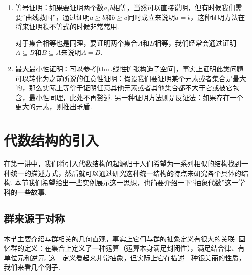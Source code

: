 \begin{enumerate}
    \item 等号证明：如果要证明两个数$a,b$相等，当然可以直接说明，但有时候我们需要``曲线救国''，通过证明$a\geqslant b$和$b\geqslant a$同时成立来说明$a=b$，这种证明方法在将来证明秩不等式的时候非常常用.

          对于集合相等也是同理，要证明两个集合$A$和$B$相等，我们经常会通过证明$A\subseteq B$和$B\subseteq A$来说明$A=B$.

    \item 最大最小性证明：可以参考\autoref{thm:线性扩张构造子空间}，事实上证明此类问题可以转化为之前所说的任意性证明：假设我们要证明某个元素或者集合是最大的，那么实际上等价于证明任意其他元素或者其他集合都不大于它或被它包含，最小性同理，此处不再赘述. 另一种证明方法则是反证法：如果存在一个更大的元素，则推出矛盾.
\end{enumerate}

\section{代数结构的引入}

在第一讲中，我们将引入代数结构的起源归于人们希望为一系列相似的结构找到一种统一的描述方式，然后就可以通过研究这种统一结构的特点来研究各个具体的结构. 本节我们希望给出一些实例展示这一思想，也简要介绍一下``抽象代数''这一学科的一些故事.

\subsection{群来源于对称}

本节主要介绍与群相关的几何直观，事实上它们与群的抽象定义有很大的关联. 回忆群的定义：在集合上定义了一种运算（运算本身满足封闭性），满足结合律、有单位元和逆元. 这一定义看起来非常抽象，但实际上它在描述一种很美丽的性质，我们来看几个例子.

